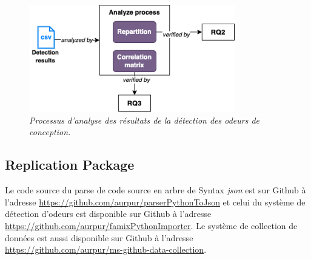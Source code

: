 \begin{figure}[h]
  \centering
  \includegraphics[width=0.8\textwidth]{figure/design_smell_analyze.png}
  \caption{\emph{Processus d'analyse des résultats de la détection des odeurs de conception.}}
  \label{fig:analysis}
\end{figure}

\subsection{Replication Package}
\label{sec:Replication Package}
Le code source du parse de code source en arbre de Syntax \emph{json} est sur
Github à l'adresse \url{https://github.com/aurpur/parserPythonToJson} et celui du
système de détection d'odeurs est disponible sur Github à l'adresse
\url{https://github.com/aurpur/famixPythonImporter}. Le système
de collection de données est aussi disponible sur Github à l'adresse
\url{https://github.com/aurpur/ms-github-data-collection}.\\
